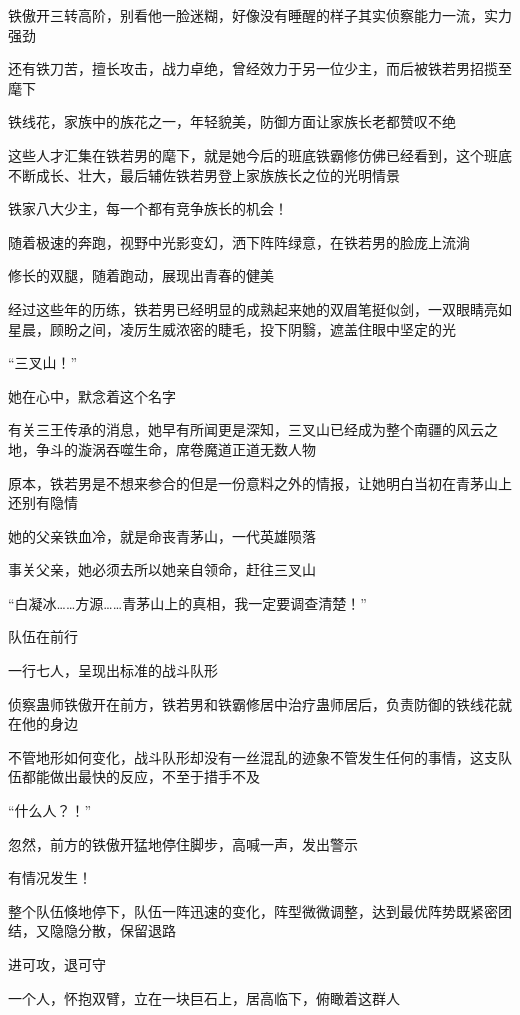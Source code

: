 \begin{this_body}
铁傲开三转高阶，别看他一脸迷糊，好像没有睡醒的样子其实侦察能力一流，实力强劲

还有铁刀苦，擅长攻击，战力卓绝，曾经效力于另一位少主，而后被铁若男招揽至麾下

铁线花，家族中的族花之一，年轻貌美，防御方面让家族长老都赞叹不绝

这些人才汇集在铁若男的麾下，就是她今后的班底铁霸修仿佛已经看到，这个班底不断成长、壮大，最后辅佐铁若男登上家族族长之位的光明情景

铁家八大少主，每一个都有竞争族长的机会！

随着极速的奔跑，视野中光影变幻，洒下阵阵绿意，在铁若男的脸庞上流淌

修长的双腿，随着跑动，展现出青春的健美

经过这些年的历练，铁若男已经明显的成熟起来她的双眉笔挺似剑，一双眼睛亮如星晨，顾盼之间，凌厉生威浓密的睫毛，投下阴翳，遮盖住眼中坚定的光

“三叉山！”

她在心中，默念着这个名字

有关三王传承的消息，她早有所闻更是深知，三叉山已经成为整个南疆的风云之地，争斗的漩涡吞噬生命，席卷魔道正道无数人物

原本，铁若男是不想来参合的但是一份意料之外的情报，让她明白当初在青茅山上还别有隐情

她的父亲铁血冷，就是命丧青茅山，一代英雄陨落

事关父亲，她必须去所以她亲自领命，赶往三叉山

“白凝冰……方源……青茅山上的真相，我一定要调查清楚！”

队伍在前行

一行七人，呈现出标准的战斗队形

侦察蛊师铁傲开在前方，铁若男和铁霸修居中治疗蛊师居后，负责防御的铁线花就在他的身边

不管地形如何变化，战斗队形却没有一丝混乱的迹象不管发生任何的事情，这支队伍都能做出最快的反应，不至于措手不及

“什么人？！”

忽然，前方的铁傲开猛地停住脚步，高喊一声，发出警示

有情况发生！

整个队伍倏地停下，队伍一阵迅速的变化，阵型微微调整，达到最优阵势既紧密团结，又隐隐分散，保留退路

进可攻，退可守

一个人，怀抱双臂，立在一块巨石上，居高临下，俯瞰着这群人


\end{this_body}
